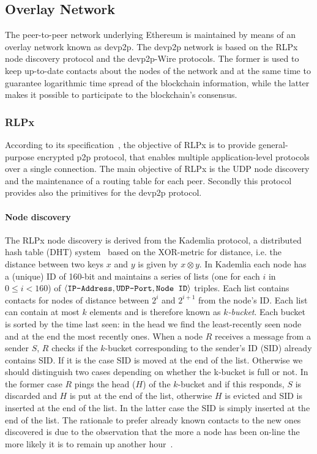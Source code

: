 \subsection{Overlay Network}
\label{sec:overlay-network}
The peer-to-peer network underlying Ethereum is maintained by means of an
overlay network known as devp2p. The devp2p network is based on the
RLPx node discovery protocol and the devp2p-Wire protocols.
The former is used to keep up-to-date contacts about
the nodes of the network and at the same time to guarantee logarithmic time
spread of the blockchain information,
while the latter makes it possible to participate to the
blockchain's consensus.

\subsubsection{RLPx}
According to its specification~\cite{bib:rlpx:spec}, the objective of RLPx is to
provide general-purpose encrypted p2p protocol, that enables multiple
application-level protocols over a single connection.
The main objective of RLPx is the UDP node discovery and the maintenance of a
routing table for each peer. Secondly this protocol provides also the primitives
for the devp2p protocol.

\paragraph{Node discovery}
The RLPx node discovery is derived from the Kademlia protocol,
a distributed hash table (DHT) system~\cite{bib:kademlia}
based on the XOR-metric for
distance, i.e. the distance between two keys $x$ and $y$ is given
by $x \otimes y$.
In Kademlia each node has a (unique) ID of 160-bit and maintains a
series of lists (one for each $i$ in $0 \leq i < 160$) of
$\langle \verb|IP-Address|, \verb|UDP-Port|, \verb|Node ID| \rangle$ triples.
Each list contains contacts for nodes of distance between $2^i$ and $2^{i+1}$
from the node's ID.
Each list can contain at most $k$ elements and is therefore known as
\textit{$k$-bucket}.
Each bucket is sorted by the time last
seen: in the head we find the least-recently seen node and at the end the most
recently ones.
When a node $R$ receives a message from a sender $S$, $R$ checks if the
$k$-bucket corresponding to the sender's ID (SID) already contains SID.
If it is the case SID is moved at the end of the list. Otherwise we should
distinguish two cases depending on whether the k-bucket is full or not.
In the former case $R$ pings the head ($H$) of the $k$-bucket and if
this responds, $S$ is discarded and $H$ is put at the end of the list,
otherwise $H$ is evicted and SID is inserted at the end of the list.
In the latter case the SID is simply inserted at the end of the list.
The rationale to prefer already known contacts to the new ones discovered
is due to the observation that the more a node has been on-line the more
likely it is to remain up another hour~\cite{bib:kademlia}.

